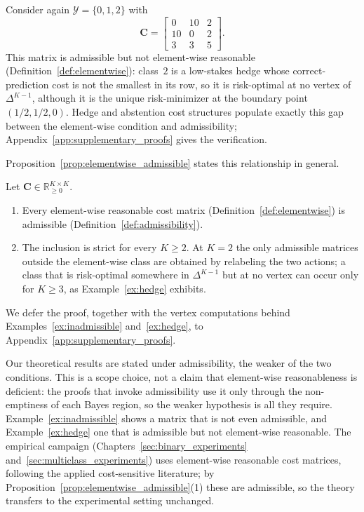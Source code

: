 \begin{example}\label{ex:hedge}
    Consider again $\mathcal{Y}=\{0, 1, 2\}$ with
    \begin{equation}
        \mathbf{C} = \begin{bmatrix}
            0 & 10 & 2 \\
            10 & 0 & 2 \\
            3 & 3 & 5
        \end{bmatrix}.
    \end{equation}
    This matrix is admissible but not element-wise reasonable (Definition~\ref{def:elementwise}): class~$2$ is a low-stakes hedge whose correct-prediction cost is not the smallest in its row, so it is risk-optimal at no vertex of $\Delta^{K-1}$, although it is the unique risk-minimizer at the boundary point $(1/2, 1/2, 0)$. Hedge and abstention cost structures populate exactly this gap between the element-wise condition and admissibility; Appendix~\ref{app:supplementary_proofs} gives the verification.
\end{example}

Proposition~\ref{prop:elementwise_admissible} states this relationship in general.

\begin{proposition}\label{prop:elementwise_admissible}
    Let $\mathbf{C} \in \mathbb{R}_{\ge 0}^{K \times K}$.
    \begin{enumerate}
        \item Every element-wise reasonable cost matrix (Definition~\ref{def:elementwise}) is admissible (Definition~\ref{def:admissibility}).
        \item The inclusion is strict for every $K \ge 2$. At $K = 2$ the only admissible matrices outside the element-wise class are obtained by relabeling the two actions; a class that is risk-optimal somewhere in $\Delta^{K-1}$ but at no vertex can occur only for $K \ge 3$, as Example~\ref{ex:hedge} exhibits.
    \end{enumerate}
\end{proposition}

We defer the proof, together with the vertex computations behind Examples~\ref{ex:inadmissible} and~\ref{ex:hedge}, to Appendix~\ref{app:supplementary_proofs}.

Our theoretical results are stated under admissibility, the weaker of the two conditions. This is a scope choice, not a claim that element-wise reasonableness is deficient: the proofs that invoke admissibility use it only through the non-emptiness of each Bayes region, so the weaker hypothesis is all they require. Example~\ref{ex:inadmissible} shows a matrix that is not even admissible, and Example~\ref{ex:hedge} one that is admissible but not element-wise reasonable. The empirical campaign (Chapters~\ref{sec:binary_experiments} and~\ref{sec:multiclass_experiments}) uses element-wise reasonable cost matrices, following the applied cost-sensitive literature; by Proposition~\ref{prop:elementwise_admissible}(1) these are admissible, so the theory transfers to the experimental setting unchanged.

